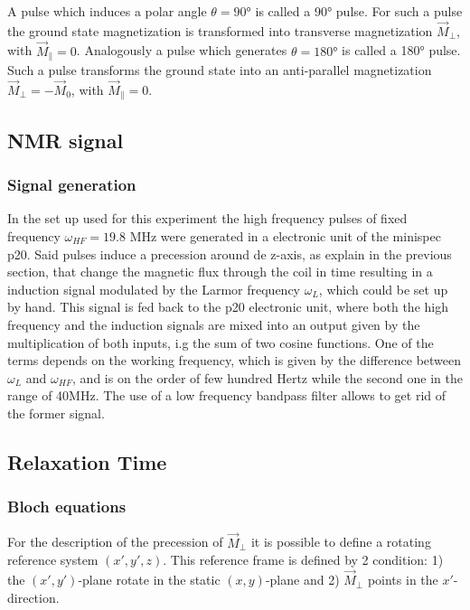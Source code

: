 A pulse which induces a  polar angle $\theta = 90$° is called a 90° pulse. For such a pulse the ground state magnetization is transformed into transverse magnetization $\vec{M}_{\perp}$, with $\vec{M}_{\parallel} = 0$. Analogously a pulse which generates $\theta = 180°$ is called a 180° pulse. Such a pulse transforms the ground state into an anti-parallel magnetization $\vec{M}_{\perp} = -\vec{M}_0$, with $\vec{M}_{\parallel} = 0$.
\subsection{NMR signal}
\subsubsection{Signal generation}
In the set up used for this experiment the high frequency pulses of fixed frequency $\omega_{HF} = 19.8$ MHz were generated in a electronic unit of the minispec p20. Said pulses induce a precession around de z-axis, as explain in the previous section, that change the magnetic flux through the coil in time resulting in a induction signal modulated by the Larmor frequency $\omega_L$, which could be set up by hand. This signal is fed back to the p20 electronic unit, where both the high frequency and the induction signals are mixed into an output given by the multiplication of both inputs, i.g the sum of two cosine functions. One of the terms depends on the working frequency, which is given by the difference between $\omega_L$ and $\omega_{HF}$, and is on the order of few hundred Hertz while the second one in the range of 40MHz. The use of a low frequency bandpass filter allows to get rid of the former signal.   
\subsection{Relaxation Time}
\subsubsection{Bloch equations}
For the description of the precession of $\vec{M}_{\perp}$ it is possible to define a rotating reference system $(x', y', z)$. This reference frame is defined by 2 condition: 1) the $(x', y')$-plane rotate in the static $(x, y)$-plane and 2) $\vec{M}_{\perp}$ points in the $x'$-direction.


